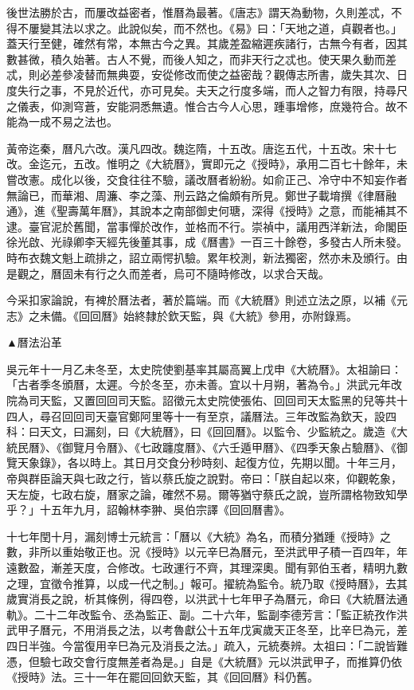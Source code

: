 
後世法勝於古，而屢改益密者，惟曆為最著。《唐志》謂天為動物，久則差忒，不得不屢變其法以求之。此說似矣，而不然也。《易》曰：「天地之道，貞觀者也。」蓋天行至健，確然有常，本無古今之異。其歲差盈縮遲疾諸行，古無今有者，因其數甚微，積久始著。古人不覺，而後人知之，而非天行之忒也。使天果久動而差忒，則必差參凌替而無典耍，安從修改而使之益密哉？觀傳志所書，歲失其次、日度失行之事，不見於近代，亦可見矣。夫天之行度多端，而人之智力有限，持尋尺之儀表，仰測穹蒼，安能洞悉無遺。惟合古今人心思，踵事增修，庶幾符合。故不能為一成不易之法也。

黃帝迄秦，曆凡六改。漢凡四改。魏迄隋，十五改。唐迄五代，十五改。宋十七改。金迄元，五改。惟明之《大統曆》，實即元之《授時》，承用二百七十餘年，未嘗改憲。成化以後，交食往往不驗，議改曆者紛紛。如俞正己、冷守中不知妄作者無論已，而華湘、周濂、李之藻、刑云路之倫頗有所見。鄭世子載堉撰《律曆融通》，進《聖壽萬年曆》，其說本之南部御史何瑭，深得《授時》之意，而能補其不逮。臺官泥於舊聞，當事憚於改作，並格而不行。崇禎中，議用西洋新法，命閣臣徐光啟、光祿卿李天經先後董其事，成《曆書》一百三十餘卷，多發古人所未發。時布衣魏文魁上疏排之，詔立兩愕扒驗。累年校測，新法獨密，然亦未及頒行。由是觀之，曆固未有行之久而差者，烏可不隨時修改，以求合天哉。

今采扣家論說，有裨於曆法者，著於篇端。而《大統曆》則述立法之原，以補《元志》之未備。《回回曆》始終隸於欽天監，與《大統》參用，亦附錄焉。

▲曆法沿革

吳元年十一月乙未冬至，太史院使劉基率其屬高翼上戊申《大統曆》。太祖諭曰：「古者季冬頒曆，太遲。今於冬至，亦未善。宜以十月朔，著為令。」洪武元年改院為司天監，又置回回司天監。詔徵元太史院使張佑、回回司天太監黑的兒等共十四人，尋召回回司天臺官鄭阿里等十一有至京，議曆法。三年改監為欽天，設四科：曰天文，曰漏刻，曰《大統曆》，曰《回回曆》。以監令、少監統之。歲造《大統民曆》、《御覽月令曆》、《七政躔度曆》、《六壬遁甲曆》、《四季天象占驗曆》、《御覽天象錄》，各以時上。其日月交食分秒時刻、起復方位，先期以聞。十年三月，帝與群臣論天與七政之行，皆以蔡氏旋之說對。帝曰：「朕自起以來，仰觀乾象，天左旋，七政右旋，曆家之論，確然不易。爾等猶守蔡氏之說，豈所謂格物致知學乎？」十五年九月，詔翰林李翀、吳伯宗譯《回回曆書》。

十七年閏十月，漏刻博士元統言：「曆以《大統》為名，而積分猶踵《授時》之數，非所以重始敬正也。況《授時》以元辛巳為曆元，至洪武甲子積一百四年，年遠數盈，漸差天度，合修改。七政運行不齊，其理深奧。聞有郭伯玉者，精明九數之理，宜徵令推算，以成一代之制。」報可。擢統為監令。統乃取《授時曆》，去其歲實消長之說，析其條例，得四卷，以洪武十七年甲子為曆元，命曰《大統曆法通軌》。二十二年改監令、丞為監正、副。二十六年，監副李德芳言：「監正統孜作洪武甲子曆元，不用消長之法，以考魯獻公十五年戊寅歲天正冬至，比辛巳為元，差四日半強。今當復用辛巳為元及消長之法。」疏入，元統奏辨。太祖曰：「二說皆難憑，但驗七政交會行度無差者為是。」自是《大統曆》元以洪武甲子，而推算仍依《授時》法。三十一年在罷回回欽天監，其《回回曆》科仍舊。


